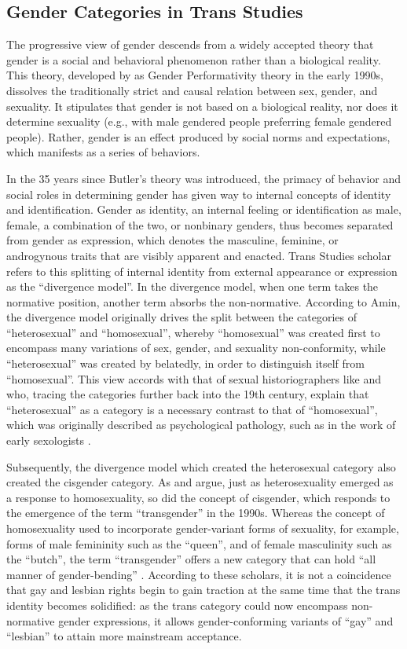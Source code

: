 \documentclass[anonymous,review]{acmart}
\begin{document}
\subsection{Gender Categories in Trans Studies}
The progressive view of gender descends from a widely accepted theory that gender is a social and behavioral phenomenon rather than a biological reality. This theory, developed by \citet{butler:1990} as Gender Performativity theory in the early 1990s, dissolves the traditionally strict and causal relation between sex, gender, and sexuality. It stipulates that gender is not based on a biological reality, nor does it determine sexuality (e.g., with male gendered people preferring female gendered people). Rather, gender is an effect produced by social norms and expectations, which manifests as a series of behaviors.

In the 35 years since Butler’s theory was introduced, the primacy of behavior and social roles in determining gender has given way to internal concepts of identity and identification. Gender as identity, an internal feeling or identification as male, female, a combination of the two, or nonbinary genders, thus becomes separated from gender as expression, which denotes the masculine, feminine, or androgynous traits that are visibly apparent and enacted. Trans Studies scholar \citet{amin:2022} refers to this splitting of internal identity from external appearance or expression as the “divergence model”.  In the divergence model, when one term takes the normative position, another term absorbs the non-normative. According to Amin, the divergence model originally drives the split between the categories of “heterosexual” and “homosexual”, whereby “homosexual” was created first to encompass many variations of sex, gender, and sexuality non-conformity, while “heterosexual” was created by belatedly, in order to distinguish itself from “homosexual”. This view accords with that of sexual historiographers like \citet{foucault:1978} and \citet{halperin:2002} who, tracing the categories further back into the 19th century, explain that “heterosexual” as a category is a necessary contrast to that of “homosexual”, which was originally described as psychological pathology, such as in the work of early sexologists \citep{krafft-ebing:2021,ellis:1900}.

Subsequently, the divergence model which created the heterosexual category also created the cisgender category. As \citet{amin:2022} and \citet{enke:2013} argue, just as heterosexuality emerged as a response to homosexuality, so did the concept of cisgender, which responds to the emergence of the term “transgender” in the 1990s. Whereas the concept of homosexuality used to incorporate gender-variant forms of sexuality, for example, forms of male femininity such as the “queen”, and of female masculinity such as the “butch”, the term “transgender” offers a new category that can hold “all manner of gender-bending” \citep{amin:2022}. According to these scholars, it is not a coincidence that gay and lesbian rights begin to gain traction at the same time that the trans identity becomes solidified: as the trans category could now encompass non-normative gender expressions, it allows gender-conforming variants of “gay” and “lesbian” to attain more mainstream acceptance. 
\end{document}
